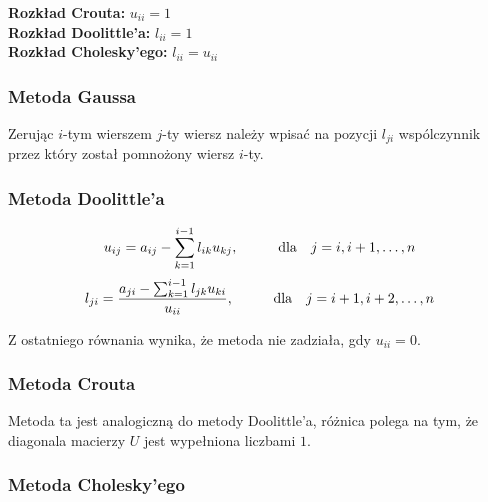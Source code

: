 \documentclass[../mn-notatki.tex]{subfiles}
\begin{document}
\textbf{Rozkład Crouta:} $u_{ii} = 1$\\
\textbf{Rozkład Doolittle'a:} $l_{ii} = 1$\\
\textbf{Rozkład Cholesky'ego:} $l_{ii} = u_{ii}$


\subsubsection{Metoda Gaussa}
Zerując $i$-tym wierszem $j$-ty wiersz należy wpisać na pozycji $l_{ji}$
wspólczynnik przez który został pomnożony wiersz $i$-ty.

\subsubsection{Metoda Doolittle'a}
\[
u_{ij} = a_{ij} - \sum_{k=1}^{i-1} l_{ik} u_{kj}, \hspace*{1cm} \text{dla ~~} j = i, i+1, \ldots, n
\]
\[
l_{ji} = \frac{ a_{ji} - \sum_{k=1}^{i-1} l_{jk} u_{ki} }{u_{ii}}, \hspace*{1cm} \text{dla ~~} j = i+1, i+2, \ldots, n
\]

Z ostatniego równania wynika, że metoda nie zadziała, gdy
$u_{ii}=0$.

\subsubsection{Metoda Crouta}

Metoda ta jest analogiczną do metody Doolittle’a, różnica polega na tym, że
diagonala macierzy $U$ jest wypełniona liczbami $1$.

\subsubsection{Metoda Cholesky'ego}
\end{document}
